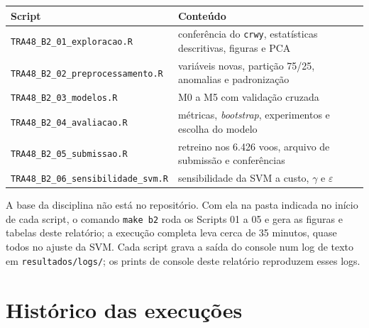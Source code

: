 \documentclass[12pt,a4paper]{article}
\begin{document}
\begin{table}[H]\centering\footnotesize
\begin{tabular}{ll}
\toprule
Script & Conteúdo\\
\midrule
\texttt{TRA48\_B2\_01\_exploracao.R} & conferência do \texttt{crwy}, estatísticas descritivas, figuras e PCA\\
\texttt{TRA48\_B2\_02\_preprocessamento.R} & variáveis novas, partição 75/25, anomalias e padronização\\
\texttt{TRA48\_B2\_03\_modelos.R} & M0 a M5 com validação cruzada\\
\texttt{TRA48\_B2\_04\_avaliacao.R} & métricas, \textit{bootstrap}, experimentos e escolha do modelo\\
\texttt{TRA48\_B2\_05\_submissao.R} & retreino nos 6.426 voos, arquivo de submissão e conferências\\
\texttt{TRA48\_B2\_06\_sensibilidade\_svm.R} & sensibilidade da SVM a custo, $\gamma$ e $\varepsilon$\\
\bottomrule
\end{tabular}
\end{table}

A base da disciplina não está no repositório. Com ela na pasta indicada no início de cada script, o comando \texttt{make b2} roda os Scripts 01 a 05 e gera as figuras e tabelas deste relatório; a execução completa leva cerca de 35 minutos, quase todos no ajuste da SVM. Cada script grava a saída do console num log de texto em \texttt{resultados/logs/}; os prints de console deste relatório reproduzem esses logs.

\section{Histórico das execuções}\label{ap:historico}
\end{document}
